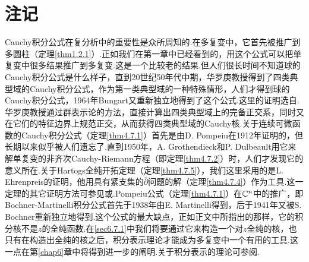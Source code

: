 \section*{注记}
Cauchy积分公式在复分析中的重要性是众所周知的.在多复变中，它首先被推广到多圆柱（定理\ref{thm1.2.1}）.正如我们在第一章中已经看到的，用这个公式可以把单复变中很多结果推广到多复变.这是一个比较老的结果.但人们很长时间不知道球的Cauchy积分公式是什么样子，直到20世纪50年代中期，华罗庚教授\cite{华罗庚1958多复变数函数论中的典型域的调和分析}得到了四类典型域的Cauchy积分公式，作为第一类典型域的一种特殊情形，人们才得到球的Cauchy积分公式，1964年Bungart\cite{bungart1964boundary}又重新独立地得到了这个公式.这里的证明选自\cite{rudin2008function}.华罗庚教授通过群表示论的方法，直接计算出四类典型域上的完备正交系，同时又在它们的特征边界上规范正交，从而获得四类典型域的Cauchy核.关于连续可微函数的Cauchy积分公式（定理\ref{thm4.7.1}）首先是由D. Pompeiu在1912年证明的，但长期以来似乎被人们遗忘了.直到1950年，A. Grothendieck和P. Dulbeault用它来解单复变的非齐次Cauchy-Riemann方程（即定理\ref{thm4.7.2}）时，人们才发现它的意义所在.关于Hartogs全纯开拓定理（定理\ref{thm4.7.5}），我们这里采用的是L. Ehrenpreis\cite{ehrenpreis1961new}的证明，他用具有紧支集的$\bar{\partial}$问题的解（定理\ref{thm4.7.4}）作为工具.这一定理的其它证明方法可参见\cite[p.159]{range1998holomorphic}或\cite{bochner1943analytic}.Pompeiu公式（定理\ref{thm4.7.1}）在$\mathbb C^n$中的推广，即Bochner-Martinelli积分公式首先于1938年由E. Martinelli得到，后于1941年又被S. Bochner重新独立地得到.这个公式的最大缺点，正如正文中所指出的那样，它的积分核不是$z$的全纯函数.在\ref{sec6.7.1}中我们将要通过它来构造一个对$z$全纯的核，也只有在构造出全纯的核之后，积分表示理论才能成为多复变中一个有用的工具.这一点在第\ref{chap6}章中将得到进一步的阐明.关于积分表示的理论可参阅\cite{range1998holomorphic}.